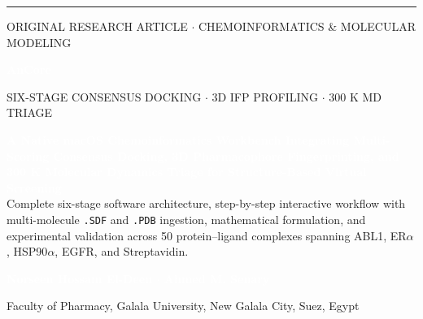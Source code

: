 \documentclass[11pt,a4paper]{article}
\begin{document}
\thispagestyle{empty}
\pagecolor{coverbg}
\noindent\hspace*{-6mm}%
\begin{minipage}[t][0.96\textheight][t]{4mm}
  \vspace{0pt}%
  \textcolor{coverteal}{\rule{2.4pt}{0.95\textheight}}
\end{minipage}%
\hspace{8mm}%
\begin{minipage}[t][0.96\textheight][t]{\dimexpr\textwidth-6mm\relax}
  \vspace{0pt}%
  \vspace*{14mm}
  {\sffamily\fontsize{9}{11}\selectfont{}\textcolor{coverteal}{ORIGINAL RESEARCH ARTICLE $\cdot$ CHEMOINFORMATICS \& MOLECULAR MODELING}}\par
  \vspace{12mm}
  {\rmfamily\bfseries\fontsize{42}{48}\selectfont\textcolor{white}{AnCore}}\par
  \vspace{8mm}
  {\sffamily\fontsize{10}{13}\selectfont{}\textcolor{coverteal}{SIX-STAGE CONSENSUS DOCKING $\cdot$ 3D IFP PROFILING $\cdot$ 300 K MD TRIAGE}}\par
  \vspace{14mm}
  \begin{minipage}{0.92\linewidth}
    {\sffamily\fontsize{13.5}{20}\selectfont\textcolor{white}{%
      \textbf{A Native macOS Chemoinformatics Workbench Integrating Multi-Scoring Consensus Docking, 3D Pharmacophore Fingerprinting, and 300 K Molecular Dynamics Triage for Structure-Based Virtual Screening}%
    }}\\[10pt]
    {\sffamily\fontsize{11.5}{17.5}\selectfont\textcolor{coversub}{%
      Complete six-stage software architecture, step-by-step interactive workflow with multi-molecule \texttt{.SDF} and \texttt{.PDB} ingestion, mathematical formulation, and experimental validation across 50 protein--ligand complexes spanning ABL1, ER$\alpha$, HSP90$\alpha$, EGFR, and Streptavidin.%
    }}
  \end{minipage}\par
  \vfill
  {\sffamily\bfseries\fontsize{13}{16}\selectfont\textcolor{white}{Norseen Hossam El-Deen \hspace{0.4em}\textcolor{coverteal}{$\cdot$}\hspace{0.4em} Ahmed M. Senary}}\par
  \vspace{4mm}
  {\sffamily\fontsize{10.5}{14}\selectfont\textcolor{covermuted}{Faculty of Pharmacy, Galala University, New Galala City, Suez, Egypt}}\par
  \vspace{28mm}
  \par
  \vspace*{1mm}
\end{minipage}
\end{document}
